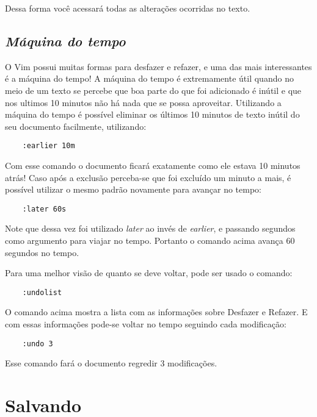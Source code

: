 Dessa forma você acessará todas as alterações ocorridas no texto.


\subsection{{\em Máquina do tempo}}
\label{Máquina do tempo}

O Vim possui muitas formas para desfazer e refazer, e uma das mais interessantes é a máquina do tempo!
A máquina do tempo é extremamente útil quando no meio de um texto se percebe que boa parte do que foi adicionado
é inútil e que nos ultimos 10 minutos não há nada que se possa aproveitar. Utilizando a máquina do tempo
é possível eliminar os últimos 10 minutos de texto inútil do seu documento facilmente, utilizando:

\begin{verbatim}
    :earlier 10m
\end{verbatim}

Com esse comando o documento ficará exatamente como ele estava 10 minutos atrás!
Caso após a exclusão perceba-se que foi excluído um minuto a mais, é possível utilizar o mesmo padrão novamente para avançar no tempo:
         
\begin{verbatim}
    :later 60s
\end{verbatim}
                  
Note que dessa vez foi utilizado {\em later} ao invés de {\em earlier}, e passando segundos como argumento para viajar no tempo.
Portanto o comando acima avança 60 segundos no tempo.

Para uma melhor visão de quanto se deve voltar, pode ser usado o comando:
                  
\begin{verbatim}
    :undolist
\end{verbatim}
                           
O comando acima mostra a lista com as informações sobre Desfazer e Refazer. E com essas informações pode-se voltar no tempo seguindo
cada modificação:

\begin{verbatim}
    :undo 3
\end{verbatim}
                                    
Esse comando fará o documento regredir 3 modificações.

\section{Salvando}
\label{sec:Salvando}

